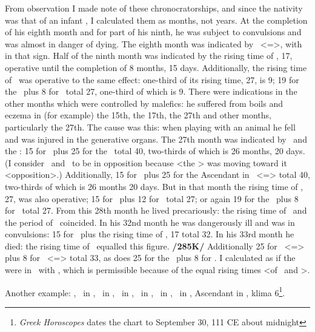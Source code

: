 From observation I made note of these chronocratorships, and since the nativity was that of an infant \mndl, I calculated them as months, not years. At the completion of his eighth month and for part of his ninth, he was subject to convulsions and was almost in danger of dying. The eighth month was indicated by \Libra\, <=\Venus>, with \Saturn\, in that sign. Half of the ninth month was indicated by the rising time of \Aries, 17, operative until the completion of 8 months, 15 days. Additionally, the rising time of \Capricorn\, was operative to the same effect: one-third of its rising time, 27, is 9; 19 for the \Sun\, plus 8 for \Venus\, total 27, one-third of which is 9. There were indications in the other months which were controlled by malefics: he suffered from boils and eczema in (for example) the 15th, the 17th, the 27th and other months, particularly the 27th. The cause was this: when playing with
an animal he fell and was injured in the generative organs. The 27th month was indicated by \Mars\, and the \Moon: 15 for \Mars\, plus 25 for the \Moon\, total 40, two-thirds of which is 26 months, 20 days. (I consider \Aries\, and \Virgo\, to be in opposition because <the \Moon> was moving toward it <opposition>.) Additionally, 15 for \Mars\, plus 25 for the Ascendant in \Cancer\, <=\Moon> total 40, two-thirds of which is 26 months 20 days. But in that month the rising time of \Capricorn, 27, was also operative; 15 for \Mars\, plus 12 for \Jupiter\, total 27; or again 19 for the \Sun\, plus 8 for \Venus\, total 27. From this 28th month he lived precariously: the rising time of \Libra\, and the period of \Saturn\, coincided. In his 32nd month he was dangerously ill and was in convulsions: 15 for \Mars\, plus the rising time of \Aries, 17 total 32. In his 33rd month he died: the rising time of \Cancer\, equalled this figure. \textbf{/285K/} Additionally 25 for \Cancer\, <=\Moon> plus 8 for \Libra\, <=\Venus> total 33, as does 25 for the \Moon\, plus 8 for \Libra. I calculated as if the \Moon\, were in \Libra\, with \Saturn, which is permissible because of the equal rising times <of \Virgo\, and \Libra>.

Another example: \Sun, \Mercury\, in \Libra, \Moon\, in \Aquarius, \Saturn\, in \Pisces, \Jupiter\, in \Capricorn,
\Mars\, in \Aries, \Venus\, in \Leo, Ascendant in \Cancer, klima 6\footnote{\textit{Greek Horoscopes} dates the chart to September 30, 111 CE about midnight}.

